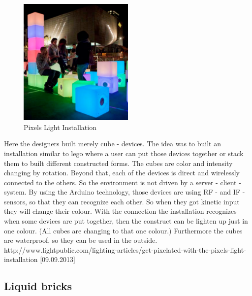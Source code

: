 \begin{figure}[h!]
	\centering
	\includegraphics[width=0.5\textwidth, clip=true, keepaspectratio=true]{./pic/pixels_light_installation.png}
	\caption{Pixels Light Installation}
	\label{fig:pixels_light_installation}
\end{figure}
Here the designers built merely cube - devices. \newline
The idea was to built an installation similar to lego \texttrademark where a user can put those devices together or stack them to built different constructed forms. \newline
The cubes are color and intensity changing by rotation. Beyond that, each of the devices is direct and wirelessly connected to the others. So the environment is not driven by a server - client - system.\newline
By using the Arduino technology, those devices are using RF - and IF - sensors, so that they can recognize each other. So when they got kinetic input they will change their colour. With the connection the installation recognizes when some devices are put together, then the construct can be lighten up just in one colour. (All cubes are changing to that one colour.)\newline
 Furthermore the cubes are waterproof, so they can be used in the outside.\newline
\newline
http://www.lightpublic.com/lighting-articles/get-pixelated-with-the-pixels-light-installation [09.09.2013] \newline

\subsection{Liquid bricks}

